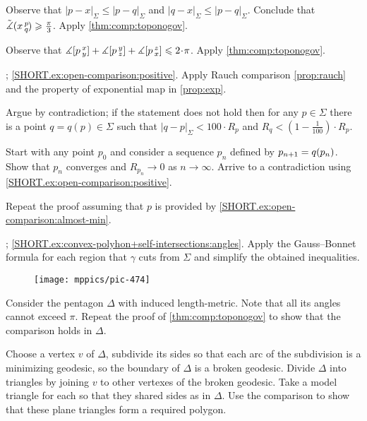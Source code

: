 \setcounter{eqtn}{0}

Observe that $|p-x|_\Sigma\le |p-q|_\Sigma$ and $|q-x|_\Sigma\le |p-q|_\Sigma$.
Conclude that $\tilde\measuredangle(x\,{}^{p}_{q}\hspace{-0.2ex})\geqslant \tfrac\pi3$.
Apply \ref{thm:comp:toponogov}.

Observe that 
$\measuredangle\hinge pxy+\measuredangle\hinge pyz+\measuredangle\hinge pzx\le2\cdot \pi$.
Apply \ref{thm:comp:toponogov}.

\parbf{\ref{ex:open-comparison}}; \ref{SHORT.ex:open-comparison:positive}. Apply Rauch comparison \ref{prop:rauch} and the property of exponential map in \ref{prop:exp}.

 Argue by contradiction;
if the statement does not hold then for any $p\in\Sigma$ there is a point $q=q(p)\in \Sigma$ such that 
$|q-p|_\Sigma< 100\cdot R_p$
and
$R_q<(1-\tfrac1{100})\cdot R_p$.

Start with any point $p_0$ and consider a sequence $p_n$ defined by $p_{n+1}\z=q(p_n)$.
Show that $p_n$ converges and $R_{p_n}\to 0$ as $n\to\infty$.
Arrive to a contradiction using  \ref{SHORT.ex:open-comparison:positive}.

 Repeat the proof assuming that $p$ is provided by \ref{SHORT.ex:open-comparison:almost-min}.

\parbf{\ref{ex:convex-polyhon+self-intersections}}; \ref{SHORT.ex:convex-polyhon+self-intersections:angles}.
Apply the Gauss--Bonnet formula for each region that $\gamma$ cuts from $\Sigma$ and simplify the obtained inequalities.

\begin{wrapfigure}[9]{r}{50 mm}
\vskip-0mm
\centering
\texttt{[image: mppics/pic-474]}
\vskip8mm
\end{wrapfigure}

Consider the pentagon $\Delta$ with induced length-metric.
Note that all its angles cannot exceed $\pi$.
Repeat the proof of \ref{thm:comp:toponogov} to show that the comparison holds in $\Delta$.

Choose a vertex $v$ of $\Delta$, subdivide its sides so that each arc of the subdivision is a minimizing geodesic, so the boundary of $\Delta$ is a broken geodesic.
Divide $\Delta$ into triangles by joining $v$ to other vertexes of the broken geodesic.
Take a model triangle for each so that they shared sides as in $\Delta$.
Use the comparison to show that these plane triangles form a required polygon.

